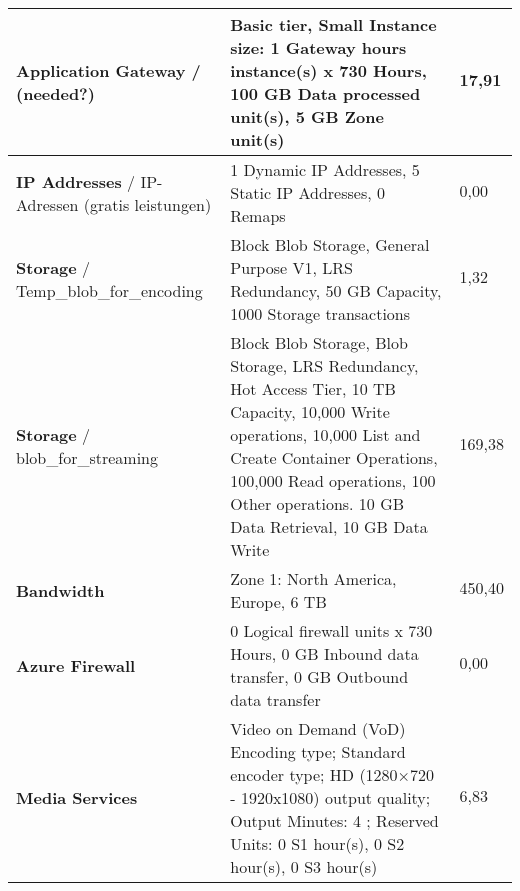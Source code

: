 \begin{landscape}
\begin{table}[]
\begin{tabularx}{\linewidth}{|l||l|l|}
\textbf{Application Gateway}      / (needed?)                               & Basic tier, Small Instance size: 1 Gateway hours instance(s) x 730 Hours, 100 GB Data processed unit(s), 5 GB Zone unit(s)                                                                                                                     & 17,91                                   \\ \hline
\textbf{IP Addresses}             / IP-Adressen (gratis leistungen)         & 1 Dynamic IP Addresses, 5 Static IP Addresses, 0 Remaps                                                                                                                                                                                        & 0,00                                    \\ \hline
\textbf{Storage}                  / Temp\_blob\_for\_encoding               & Block Blob Storage, General Purpose V1, LRS Redundancy, 50 GB Capacity, 1000 Storage transactions                                                                                                                                              & 1,32                                    \\ \hline
\textbf{Storage}                  / blob\_for\_streaming                    & Block Blob Storage, Blob Storage, LRS Redundancy, Hot Access Tier, 10 TB Capacity, 10,000 Write operations, 10,000 List and Create Container Operations, 100,000 Read operations, 100 Other operations. 10 GB Data Retrieval, 10 GB Data Write & 169,38                                  \\ \hline
\textbf{Bandwidth}                                                         & Zone 1: North America, Europe, 6 TB                                                                                                                                                                                                            & 450,40                                  \\ \hline
\textbf{Azure Firewall}                                                    & 0 Logical firewall units x 730 Hours, 0 GB Inbound data transfer, 0 GB Outbound data transfer                                                                                                                                                  & 0,00                                    \\ \hline
\textbf{Media Services}                                                    & Video on Demand (VoD) Encoding type; Standard encoder type; HD (1280×720 - 1920x1080) output quality; Output Minutes: 4 ; Reserved Units: 0 S1 hour(s), 0 S2 hour(s), 0 S3 hour(s)                                                             & 6,83                                    \\ \hline

\end{tabularx}
\end{table}
\end{landscape}
